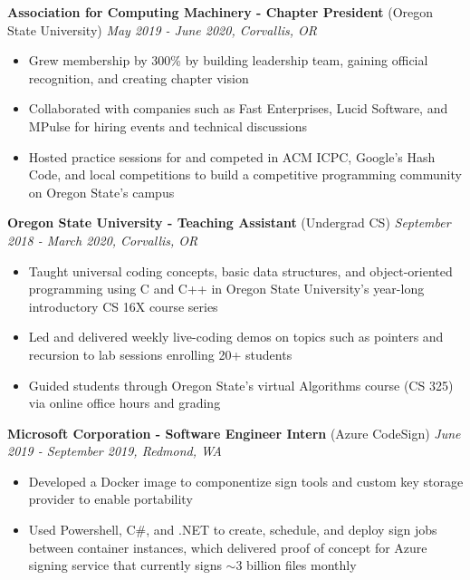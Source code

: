 \documentclass{article}
\begin{document}
\vskip 0.1in

\noindent \normalsize \textbf{Association for Computing Machinery - Chapter President} \footnotesize (Oregon State University) \hfill \small \textit{May 2019 - June 2020, Corvallis, OR}
\begin{itemize}
\item Grew membership by 300\% by building leadership team, gaining official recognition, and creating chapter vision
\item Collaborated with companies such as Fast Enterprises, Lucid Software, and MPulse for hiring events and technical discussions
\item Hosted practice sessions for and competed in ACM ICPC, Google’s Hash Code, and local competitions to build a competitive programming community on Oregon State's campus
\end{itemize}

\vskip 0.1in

\noindent \normalsize \textbf{Oregon State University - Teaching Assistant} \footnotesize (Undergrad CS) \hfill \small \textit{September 2018 - March 2020, Corvallis, OR}
\begin{itemize}
\item Taught universal coding concepts, basic data structures, and object-oriented programming using C and C++ in Oregon State University’s year-long introductory CS 16X course series
\item Led and delivered weekly live-coding demos on topics such as pointers and recursion to lab sessions enrolling 20+ students
\item Guided students through Oregon State's virtual Algorithms course (CS 325) via online office hours and grading
\end{itemize}

\vskip 0.1in

\noindent \normalsize \textbf{Microsoft Corporation - Software Engineer Intern} \footnotesize (Azure CodeSign) \hfill \small \textit{June 2019 - September 2019, Redmond, WA}
\begin{itemize}
\item Developed a Docker image to componentize sign tools and custom key storage provider to enable portability
\item Used Powershell, C\#, and .NET to create, schedule, and deploy sign jobs between container instances, which delivered proof of concept for Azure signing service that currently signs $\sim$3 billion files monthly
\end{itemize}
\end{document}
